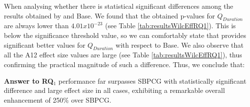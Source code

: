When analysing whether there is statistical significant differences among the results obtained by \simhotep{} and Base. We found that the obtained p-values for $Q_{Duration}$ are always lower than $4.01x10^{-23}$  (see Table \ref{tab:resultsWilcEffRQ1}). This is below the significance threshold value, so we can comfortably state that \simhotep{} provides significant better values for $Q_{Duration}$ with respect to Base. We also observe that all the  A12 effect size values are large (see Table \ref{tab:resultsWilcEffRQ1}), thus confirming the practical magnitude of such a difference. Thus, we conclude that:

\noindent \textbf{Answer to RQ$_1$} \simhotep{} performance far surpasses SBPCG with statistically significant difference and large effect size in all cases, exhibiting a remarkable overall enhancement of 250\% over SBPCG.


